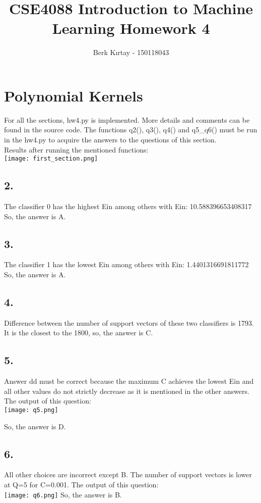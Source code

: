 \documentclass{homework}
\title
{
CSE4088 Introduction to Machine Learning 
Homework 4
}
\date{}
\author{Berk Kırtay - 150118043}
\begin{document}
\maketitle

\section*{Polynomial Kernels}
For all the sections, hw4.py is implemented. More details and comments can be found in the source code. The functions q2(), q3(), q4() and q5_q6() must be run in the hw4.py to acquire the answers to the questions of this section.\\
Results after running the mentioned functions:\\
\texttt{[image: first\_section.png]}

\subsection*{2.}
The classifier 0 has the highest Ein among others with Ein: 10.588396653408317%
So, the answer is A.

\subsection*{3.}
The classifier 1 has the lowest Ein among others with Ein: 1.4401316691811772%
So, the answer is A.

\subsection*{4.}
Difference between the number of support vectors of these two classifiers is 1793.
It is the closest to the 1800, so, the answer is C.

\subsection*{5.}
Answer dd must be correct because the maximum C
achieves the lowest Ein and all other values do not strictly
decrease as it is mentioned in the other answers.
The output of this question:\\
\texttt{[image: q5.png]}

So, the answer is D.
\subsection*{6.}
All other choices are incorrect except B. The number of support vectors is
lower at Q=5 for C=0.001.
The output of this question:\\
\texttt{[image: q6.png]}
So, the answer is B.
\end{document}
